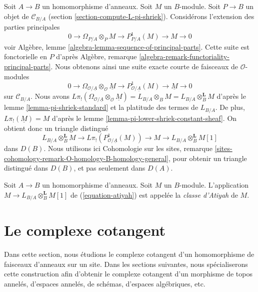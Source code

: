 \noindent
Soit $A \to B$ un homomorphisme d'anneaux. Soit $M$ un $B$-module. Soit
$P \to B$ un objet de $\mathcal{C}_{B/A}$ (section
\ref{section-compute-L-pi-shriek}). Considérons l'extension des parties
principales
$$
0 \to \Omega_{P/A} \otimes_P M \to P^1_{P/A}(M) \to M \to 0
$$
voir Algèbre, lemme \ref{algebra-lemma-sequence-of-principal-parts}. Cette
suite est fonctorielle en $P$ d'après Algèbre, remarque
\ref{algebra-remark-functoriality-principal-parts}. Nous obtenons ainsi une
suite exacte courte de faisceaux de $\mathcal{O}$-modules
$$
0 \to \Omega_{\mathcal{O}/\underline{A}} \otimes_\mathcal{O} \underline{M} \to
P^1_{\mathcal{O}/\underline{A}}(M) \to \underline{M} \to 0
$$
sur $\mathcal{C}_{B/A}$. Nous avons
$L\pi_!(\Omega_{\mathcal{O}/\underline{A}} \otimes_\mathcal{O} \underline{M})
= L_{B/A} \otimes_B M = L_{B/A} \otimes_B^\mathbf{L} M$
d'après le lemme \ref{lemma-pi-shriek-standard} et la platitude des termes de
$L_{B/A}$. De plus, $L\pi_!(\underline{M}) = M$ d'après le lemme
\ref{lemma-pi-lower-shriek-constant-sheaf}. On obtient donc un triangle
distingué
\begin{equation}
\label{equation-atiyah}
L_{B/A} \otimes_B^\mathbf{L} M \to
L\pi_!\left(P^1_{\mathcal{O}/\underline{A}}(M)\right) \to M
\to L_{B/A} \otimes_B^\mathbf{L} M [1]
\end{equation}
dans $D(B)$. Nous utilisons ici Cohomologie sur les sites, remarque
\ref{sites-cohomology-remark-O-homology-B-homology-general}, pour obtenir un
triangle distingué dans $D(B)$, et pas seulement dans $D(A)$.

\begin{definition}
\label{definition-atiyah-class}
Soit $A \to B$ un homomorphisme d'anneaux. Soit $M$ un $B$-module.
L'application $M \to L_{B/A} \otimes_B^\mathbf{L} M[1]$ de
(\ref{equation-atiyah}) est appelée la {\it classe d'Atiyah} de $M$.
\end{definition}




\section{Le complexe cotangent}
\label{section-cotangent-complex}

\noindent
Dans cette section, nous étudions le complexe cotangent d'un homomorphisme de
faisceaux d'anneaux sur un site. Dans les sections suivantes, nous
spécialiserons cette construction afin d'obtenir le complexe cotangent d'un
morphisme de topos annelés, d'espaces annelés, de schémas, d'espaces
algébriques, etc.

